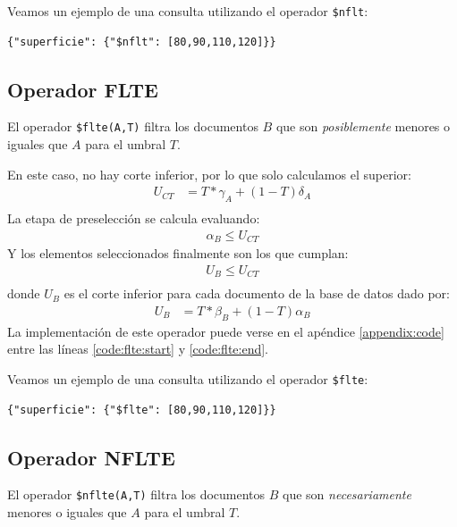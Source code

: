 \begin{example}
Veamos un ejemplo de una consulta utilizando el operador \texttt{\$nflt}:
%
\begin{verbatim}
{"superficie": {"$nflt": [80,90,110,120]}}
\end{verbatim}

\end{example}

\subsection{Operador FLTE}

El operador \texttt{\$flte(A,T)} filtra los documentos $B$ que son \textit{posiblemente} menores o iguales que $A$ para el umbral $T$.

En este caso, no hay corte inferior, por lo que solo calculamos el superior:
%
\begin{align*}
    U_{CT} &= T * \gamma_A + (1-T)\delta_A \\
\end{align*}
%
La etapa de preselección se calcula evaluando:
%
\begin{align*}
    \alpha_B \leq U_{CT}
\end{align*}
%
Y los elementos seleccionados finalmente son los que cumplan:
%
\begin{align*}
    U_B \leq U_{CT} \\
\end{align*}
%
donde $U_B$ es el corte inferior para cada documento de la base de datos dado por:
%
\begin{align*}
    U_B &= T * \beta_B + (1-T)\alpha_B
\end{align*}
%
La implementación de este operador puede verse en el apéndice \ref{appendix:code} entre las líneas \ref{code:flte:start} y \ref{code:flte:end}.

\begin{example}
Veamos un ejemplo de una consulta utilizando el operador \texttt{\$flte}:
%
\begin{verbatim}
{"superficie": {"$flte": [80,90,110,120]}}
\end{verbatim}

\end{example}

\subsection{Operador NFLTE}

El operador \texttt{\$nflte(A,T)} filtra los documentos $B$ que son \textit{necesariamente} menores o iguales que $A$ para el umbral $T$.

